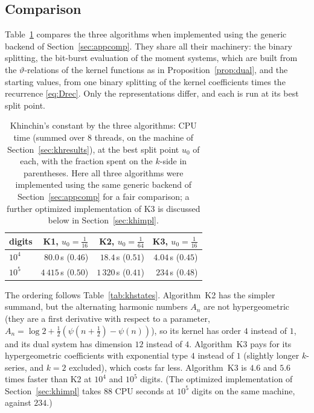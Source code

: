 \documentclass[11pt,reqno]{amsart}
\theoremstyle{definition}
\theoremstyle{remark}
\begin{document}
\subsection{Comparison}\label{sec:khcompare}
Table~\ref{tab:khcompare} compares the three algorithms
when implemented using the generic backend of Section~\ref{sec:appcomp}.
They share all their machinery: the binary splitting, the bit-burst evaluation of the moment
systems, which are built from the $\vartheta$-relations of the kernel functions as in Proposition~\ref{prop:dual},
and the starting values, from one binary splitting of the kernel coefficients times the recurrence \eqref{eq:Drec}.
Only the representations differ, and each is run at its best split point.

\begin{table}[t]
\centering\small
\caption{Khinchin's constant by the three algorithms:
CPU time (summed over $8$ threads, on the machine of Section~\ref{sec:khresults}), at the best split point
$u_0$ of each, with the fraction spent on the $k$-side in parentheses.
Here all three algorithms were implemented using the same generic backend of Section~\ref{sec:appcomp}
for a fair comparison; a further optimized implementation of K3 is discussed below in Section~\ref{sec:khimpl}.}
\label{tab:khcompare}
\begin{tabular}{lrrr}
\toprule
digits & K1, $u_0 = \frac1{16}$ & K2, $u_0 = \frac1{64}$ & K3, $u_0 = \frac1{16}$ \\
\midrule
$10^4$ & $80.0$\,s ($0.46$) & $18.4$\,s ($0.51$) & $4.04$\,s ($0.45$) \\
$10^5$ & $4\,415$\,s ($0.50$) & $1\,320$\,s ($0.41$) & $234$\,s ($0.48$) \\
\bottomrule
\end{tabular}
\end{table}

The ordering follows Table~\ref{tab:khstates}. Algorithm~K2 has the simpler summand, but the
alternating harmonic numbers $A_n$ are not hypergeometric (they are a first derivative with respect to a parameter,
$A_n = \log 2 + \frac12(\psi(n+\frac12)-\psi(n))$), so its kernel has order $4$ instead of $1$, and its dual system has
dimension $12$ instead of $4$. Algorithm~K3 pays for its hypergeometric coefficients with
exponential type $4$ instead of $1$ (slightly longer $k$-series, and $k = 2$ excluded), which costs far less.
Algorithm~K3 is $4.6$ and $5.6$ times faster than K2 at $10^4$ and $10^5$
digits. (The optimized implementation of Section~\ref{sec:khimpl} takes $88$ CPU seconds at $10^5$ digits on the
same machine, against $234$.)
\end{document}

